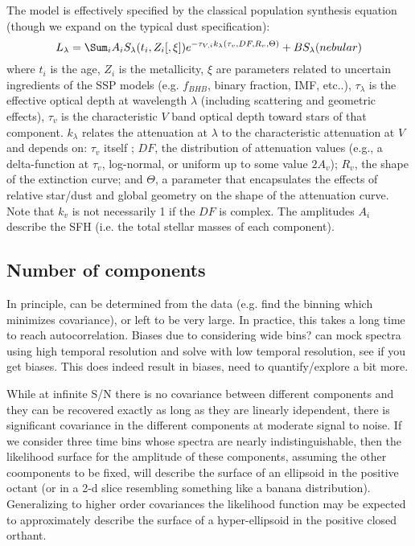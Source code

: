 The model is effectively specified by the classical population synthesis equation (though we expand on the typical dust specification):
\begin{equation}
L_\lambda = \Sum_i A_i S_\lambda (t_i, Z_i [,\xi] ) e^{-\tau_{V,i} k_\lambda( \tau_v, DF, R_v, \Theta)}  + B S_\lambda(nebular)
\end{equation}
where $t_i$ is the age, $Z_i$ is the metallicity, $\xi$ are parameters related to uncertain ingredients of the SSP models (e.g. $f_{BHB}$, binary fraction, IMF, etc..), $\tau_\lambda$ is the effective optical depth at wavelength $\lambda$ (including scattering and geometric effects), $\tau_v$ is the characteristic $V$ band optical depth toward stars of that component. $k_\lambda$ relates the attenuation at $\lambda$ to the characteristic attenuation at $V$ and depends on: $\tau_v$ itself \citep{chevallard}; $DF$,  the distribution of attenuation values (e.g., a delta-function at $\tau_v$, log-normal, or uniform up to some value $2A_v$); $R_v$, the shape of the extinction curve; and $\Theta$, a parameter that encapsulates the effects of relative star/dust and global geometry on the shape of the attenuation curve.  Note that $k_v$ is not necessarily 1 if the $DF$ is complex. The amplitudes $A_i$ describe the SFH (i.e. the total stellar masses of each component).


\subsection{Number of components}
In principle, can be determined from the data (e.g. find the binning which minimizes covariance), or left to be very large.  In practice, this takes a long time to reach autocorrelation. Biases due to considering wide bins?  can mock spectra using high temporal resolution and solve with low temporal resolution, see if you get biases.  This does indeed result in biases, need to quantify/explore a bit more.

While at infinite S/N there is no covariance between different components and they can be recovered exactly as long as they are linearly idependent, there is significant covariance in the different components at moderate signal to noise.  If we consider three time bins whose spectra are nearly indistinguishable, then the likelihood surface for the amplitude of these components, assuming the other coomponents to be fixed, will describe the surface of an ellipsoid in the positive octant (or in a 2-d slice resembling something like a banana distribution).  Generalizing to higher order covariances the likelihood function may be expected to approximately describe the surface of a hyper-ellipsoid in the positive closed orthant.

